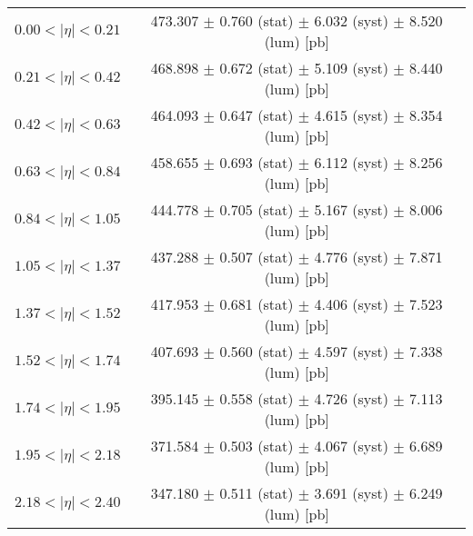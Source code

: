 \begin{tabular}{lc}
\hline
$0.00 < |\eta| <0.21$          & 473.307 $\pm$ 0.760 (stat) $\pm$ 6.032 (syst) $\pm$ 8.520 (lum) [pb]  \\
$0.21 < |\eta| <0.42$          & 468.898 $\pm$ 0.672 (stat) $\pm$ 5.109 (syst) $\pm$ 8.440 (lum) [pb]  \\
$0.42 < |\eta| <0.63$          & 464.093 $\pm$ 0.647 (stat) $\pm$ 4.615 (syst) $\pm$ 8.354 (lum) [pb]  \\
$0.63 < |\eta| <0.84$          & 458.655 $\pm$ 0.693 (stat) $\pm$ 6.112 (syst) $\pm$ 8.256 (lum) [pb]  \\
$0.84 < |\eta| <1.05$          & 444.778 $\pm$ 0.705 (stat) $\pm$ 5.167 (syst) $\pm$ 8.006 (lum) [pb]  \\
$1.05 < |\eta| <1.37$          & 437.288 $\pm$ 0.507 (stat) $\pm$ 4.776 (syst) $\pm$ 7.871 (lum) [pb]  \\
$1.37 < |\eta| <1.52$          & 417.953 $\pm$ 0.681 (stat) $\pm$ 4.406 (syst) $\pm$ 7.523 (lum) [pb]  \\
$1.52 < |\eta| <1.74$          & 407.693 $\pm$ 0.560 (stat) $\pm$ 4.597 (syst) $\pm$ 7.338 (lum) [pb]  \\
$1.74 < |\eta| <1.95$          & 395.145 $\pm$ 0.558 (stat) $\pm$ 4.726 (syst) $\pm$ 7.113 (lum) [pb]  \\
$1.95 < |\eta| <2.18$          & 371.584 $\pm$ 0.503 (stat) $\pm$ 4.067 (syst) $\pm$ 6.689 (lum) [pb]  \\
$2.18 < |\eta| <2.40$          & 347.180 $\pm$ 0.511 (stat) $\pm$ 3.691 (syst) $\pm$ 6.249 (lum) [pb]  \\
\hline
\end{tabular}
